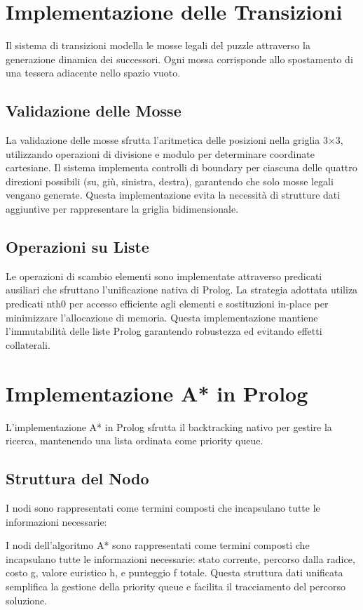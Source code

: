 \documentclass[12pt,a4paper]{report}
\theoremstyle{definition}
\begin{document}
\section{Implementazione delle Transizioni}
Il sistema di transizioni modella le mosse legali del puzzle attraverso la generazione dinamica dei successori. Ogni mossa corrisponde allo spostamento di una tessera adiacente nello spazio vuoto.

\subsection{Validazione delle Mosse}
La validazione delle mosse sfrutta l'aritmetica delle posizioni nella griglia 3×3, utilizzando operazioni di divisione e modulo per determinare coordinate cartesiane. Il sistema implementa controlli di boundary per ciascuna delle quattro direzioni possibili (su, giù, sinistra, destra), garantendo che solo mosse legali vengano generate. Questa implementazione evita la necessità di strutture dati aggiuntive per rappresentare la griglia bidimensionale.

\subsection{Operazioni su Liste}
Le operazioni di scambio elementi sono implementate attraverso predicati ausiliari che sfruttano l'unificazione nativa di Prolog. La strategia adottata utiliza predicati nth0 per accesso efficiente agli elementi e sostituzioni in-place per minimizzare l'allocazione di memoria. Questa implementazione mantiene l'immutabilità delle liste Prolog garantendo robustezza ed evitando effetti collaterali.

\section{Implementazione A* in Prolog}

L'implementazione A* in Prolog sfrutta il backtracking nativo per gestire la ricerca, mantenendo una lista ordinata come priority queue.

\subsection{Struttura del Nodo}

I nodi sono rappresentati come termini composti che incapsulano tutte le informazioni necessarie:

I nodi dell'algoritmo A* sono rappresentati come termini composti che incapsulano tutte le informazioni necessarie: stato corrente, percorso dalla radice, costo g, valore euristico h, e punteggio f totale. Questa struttura dati unificata semplifica la gestione della priority queue e facilita il tracciamento del percorso soluzione.
\end{document}
